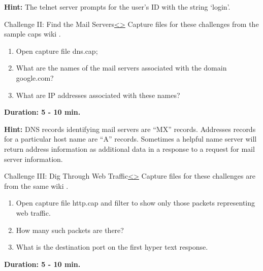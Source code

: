 \documentclass[12pt]{extarticle}
\newenvironment{instructionblock}{\Large\bgroup}{\egroup}
\begin{document}
	\noindent
	\textbf{Hint:} The telnet server prompts for the user's ID with the string `login'.
	
	
	
	
	\pagebreak
	\begin{slide}{Challenge II: Find the Mail Servers}{\hyperref[slide 23]{\textless}\hyperref[slide 25]{\textgreater}}
		\vskip 5pt
		\begin{instructionblock}
			Capture files for these challenges from the sample caps wiki \cite{sampleCaps}.
			\begin{enumerate}
				\item Open capture file dns.cap;
				\item What are the names of the mail servers associated with the domain google.com?
				\item What are IP addresses associated with these names?
			\end{enumerate}
			
			\vspace{15mm}
			\begin{center}
				 \textbf{Duration: 5 - 10 min.}
			\end{center}
		\end{instructionblock}
	\end{slide}
	\vfill
	
	\noindent
	\textbf{Hint:} DNS records identifying mail servers are ``MX'' records.  Addresses records for a particular host name are ``A'' records.  Sometimes a helpful name server will return address information as additional data in a response to a request for mail server information.
	
	
	
	
	\pagebreak
	\begin{slide}{Challenge III: Dig Through Web Traffic}{\hyperref[slide 24]{\textless}\hyperref[slide 26]{\textgreater}}
		\vskip 5pt
		\begin{instructionblock}
			Capture files for these challenges are from the same wiki \cite{sampleCaps}.
			\begin{enumerate}
				\item Open capture file http.cap and filter to show only those packets representing web traffic.
				\item How many such packets are there?
				\item What is the destination port on the first hyper text response.
			\end{enumerate}
			
			\vspace{7mm}
			\begin{center}
				 \textbf{Duration: 5 - 10 min.}
			\end{center}
		\end{instructionblock}
	\end{slide}
	
\end{document}
